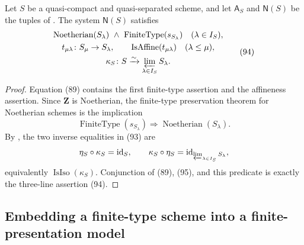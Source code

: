 \begin{proposition}
  \label{prop:nagata-noetherian-inverse-system}

  Let $S$ be a quasi-compact and quasi-separated scheme, and let
  $\mathsf A_S$ and $\mathsf N(S)$ be the tuples of
  .  The system
  \(\mathsf N(S)\) satisfies
  \[
  \begin{gathered}
    \operatorname{Noetherian}(S_\lambda)
      \ \wedge\ \operatorname{FiniteType}(s_{S_\lambda})
      \quad(\lambda\in I_S),\\
    t_{\mu\lambda}\colon S_\mu\to S_\lambda,\qquad
      \operatorname{IsAffine}(t_{\mu\lambda})
      \quad(\lambda\leq\mu),\\
    \kappa_S\colon S\xrightarrow{\sim}
      \varprojlim_{\lambda\in I_S}S_\lambda.
  \end{gathered}                                                     \tag{94}
  \]
\end{proposition}

\begin{proof}
  Equation (89) contains the first finite-type assertion and the affineness
  assertion.  Since \(\mathbf Z\) is Noetherian, the finite-type
  preservation theorem for Noetherian schemes is the implication
  \[
    \operatorname{FiniteType}(s_{S_\lambda})
      \Longrightarrow\operatorname{Noetherian}(S_\lambda).         \tag{95}
  \]
  By , the two inverse equalities in
  (93) are
  \[
    \eta_S\circ\kappa_S=\operatorname{id}_S,
    \qquad
    \kappa_S\circ\eta_S
      =\operatorname{id}_{\varprojlim_{\lambda\in I_S}S_\lambda},
  \]
  equivalently $\operatorname{IsIso}(\kappa_S)$.  Conjunction of (89), (95),
  and this predicate is exactly the three-line assertion (94).
\end{proof}
\subsection{Embedding a finite-type scheme into a finite-presentation model}

